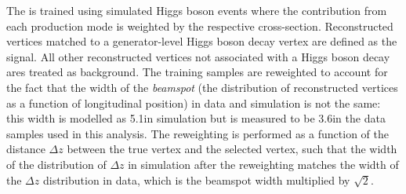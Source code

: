 The \VtxIdBdt is trained using simulated Higgs boson events %
where the contribution from each production mode is weighted by the respective cross-section. Reconstructed vertices matched to a generator-level Higgs boson decay vertex are defined as the signal. All other reconstructed vertices not associated with a Higgs boson decay ares treated as background. The training samples are reweighted to account for the fact that the width of the \emph{beamspot} (the distribution of reconstructed vertices as a function of longitudinal position) in data and simulation is not the same: this width is modelled as 5.1\cm in simulation but is measured to be 3.6\cm in the data samples used in this analysis. The reweighting is performed as a function of the distance $\Delta z$ between the true vertex and the selected vertex, such that the width of the distribution of $\Delta z$ in simulation after the reweighting matches the width of the $\Delta z$ distribution in data, which is the beamspot width multiplied by $\sqrt{2}$.

